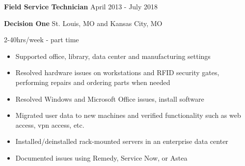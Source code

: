 \documentclass[../main.tex]{subfiles}
\begin{document}
\textbf{Field Service Technician}
\hfill
April 2013 - July 2018

\textbf{Decision One} 
\hfill 
St. Louis, MO and Kansas City, MO

\hfill 
2-40hrs/week - part time

\begin{itemize}
\item Supported office, library, data center and manufacturing settings
\item Resolved hardware issues on workstations and RFID security gates, performing repairs and ordering parts when needed
\item Resolved Windows and Microsoft Office issues, install software
\item Migrated user data to new machines and verified functionality such as web access, vpn access, etc.
\item Installed/deinstalled rack-mounted servers in an enterprise data center
\item Documented issues using Remedy, Service Now, or Astea
\end{itemize}
\end{document}
